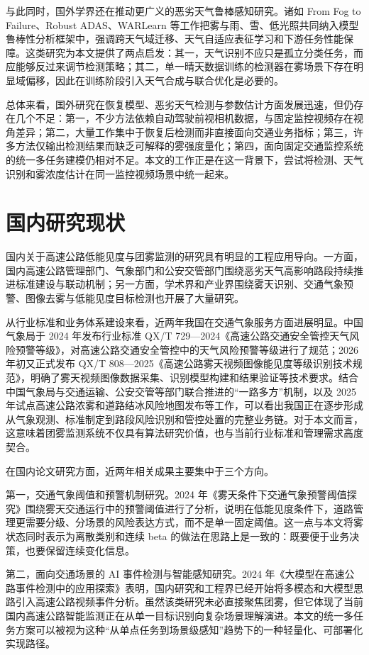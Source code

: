 与此同时，国外学界还在推动更广义的恶劣天气鲁棒感知研究。诸如 From Fog to Failure、Robust ADAS、WARLearn 等工作把雾与雨、雪、低光照共同纳入模型鲁棒性分析框架中，强调跨天气域迁移、天气自适应表征学习和下游任务性能保障。这类研究为本文提供了两点启发：其一，天气识别不应只是孤立分类任务，而应能够反过来调节检测策略；其二，单一晴天数据训练的检测器在雾场景下存在明显域偏移，因此在训练阶段引入天气合成与联合优化是必要的。

总体来看，国外研究在恢复模型、恶劣天气检测与参数估计方面发展迅速，但仍存在几个不足：第一，不少方法依赖自动驾驶前视相机数据，与固定监控视频存在视角差异；第二，大量工作集中于恢复后检测而非直接面向交通业务指标；第三，许多方法仅输出检测结果而缺乏可解释的雾强度量化；第四，面向固定交通监控系统的统一多任务建模仍相对不足。本文的工作正是在这一背景下，尝试将检测、天气识别和雾浓度估计在同一监控视频场景中统一起来。

\section{国内研究现状}

国内关于高速公路低能见度与团雾监测的研究具有明显的工程应用导向。一方面，国内高速公路管理部门、气象部门和公安交管部门围绕恶劣天气高影响路段持续推进标准建设与联动机制；另一方面，学术界和产业界围绕雾天识别、交通气象预警、图像去雾与低能见度目标检测也开展了大量研究。

从行业标准和业务体系建设来看，近两年我国在交通气象服务方面进展明显。中国气象局于 2024 年发布行业标准 QX/T 729—2024《高速公路交通安全管控天气风险预警等级》，对高速公路交通安全管控中的天气风险预警等级进行了规范；2026 年初又正式发布 QX/T 808—2025《高速公路雾天视频图像能见度等级识别技术规范》，明确了雾天视频图像数据采集、识别模型构建和结果验证等技术要求。结合中国气象局与交通运输、公安交管等部门联合推进的“一路多方”机制，以及 2025 年试点高速公路浓雾和道路结冰风险地图发布等工作，可以看出我国正在逐步形成从气象观测、标准制定到路段风险识别和管控处置的完整业务链。对于本文而言，这意味着团雾监测系统不仅具有算法研究价值，也与当前行业标准和管理需求高度契合。

在国内论文研究方面，近两年相关成果主要集中于三个方向。

第一，交通气象阈值和预警机制研究。2024 年《雾天条件下交通气象预警阈值探究》围绕雾天交通运行中的预警阈值进行了分析，说明在低能见度条件下，道路管理更需要分级、分场景的风险表达方式，而不是单一固定阈值。这一点与本文将雾状态同时表示为离散类别和连续 beta 的做法在思路上是一致的：既要便于业务决策，也要保留连续变化信息。

第二，面向交通场景的 AI 事件检测与智能感知研究。2024 年《大模型在高速公路事件检测中的应用探索》表明，国内研究和工程界已经开始将多模态和大模型思路引入高速公路视频事件分析。虽然该类研究未必直接聚焦团雾，但它体现了当前国内高速公路智能监测正在从单一目标识别向复杂场景理解演进。本文的统一多任务方案可以被视为这种“从单点任务到场景级感知”趋势下的一种轻量化、可部署化实现路径。

